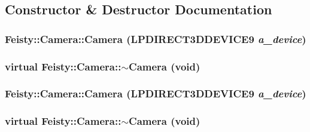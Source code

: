 \subsection{Constructor \& Destructor Documentation}
\hypertarget{class_feisty_1_1_camera_a7480bd2212144072df9186aba48a93e4}{
\subsubsection[{Camera}]{\setlength{\rightskip}{0pt plus 5cm}Feisty::Camera::Camera (LPDIRECT3DDEVICE9 {\em a\_\-device})}}
\label{class_feisty_1_1_camera_a7480bd2212144072df9186aba48a93e4}
\hypertarget{class_feisty_1_1_camera_a8dd5a9f236d04875100a7404ada01edc}{
\subsubsection[{$\sim$Camera}]{\setlength{\rightskip}{0pt plus 5cm}virtual Feisty::Camera::$\sim$Camera (void)}}
\label{class_feisty_1_1_camera_a8dd5a9f236d04875100a7404ada01edc}
\hypertarget{class_feisty_1_1_camera_a7480bd2212144072df9186aba48a93e4}{
\subsubsection[{Camera}]{\setlength{\rightskip}{0pt plus 5cm}Feisty::Camera::Camera (LPDIRECT3DDEVICE9 {\em a\_\-device})}}
\label{class_feisty_1_1_camera_a7480bd2212144072df9186aba48a93e4}
\hypertarget{class_feisty_1_1_camera_a8dd5a9f236d04875100a7404ada01edc}{
\subsubsection[{$\sim$Camera}]{\setlength{\rightskip}{0pt plus 5cm}virtual Feisty::Camera::$\sim$Camera (void)}}
\label{class_feisty_1_1_camera_a8dd5a9f236d04875100a7404ada01edc}


